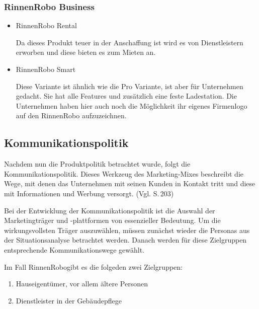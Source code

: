         \subsubsection{RinnenRobo Business}
            \begin{itemize}
                \item RinnenRobo Rental
                
                    Da dieses Produkt teuer in der Anschaffung ist wird es von Dienstleistern erworben und diese bieten
                    es zum Mieten an.  

                \item RinnenRobo Smart
                
                    Diese Variante ist ähnlich wie die Pro Variante, ist aber für Unternehmen gedacht. Sie hat alle
                    Features und zusätzlich eine feste Ladestation. Die Unternehmen haben hier auch noch die Möglichkeit
                    ihr eigenes Firmenlogo auf den RinnenRobo aufzuzeichnen. 
            \end{itemize}

            \subsection{Kommunikationspolitik} \label{Kompo}
            Nachdem nun die Produktpolitik betrachtet wurde, folgt die Kommunikationspolitik. Dieses Werkzeug des 
            Marketing-Mixes beschreibt die Wege, mit denen das Unternehmen mit seinen Kunden in Kontakt tritt und diese mit
            Informationen und Werbung versorgt. (Vgl. \cite{Kuss2016} S.\,203)
        
            \noindent
            Bei der Entwicklung der Kommunikationspolitik ist die Auswahl der Marketingträger und -plattformen von essenzieller
            Bedeutung. Um die wirkungsvollsten Träger auszuwählen, müssen zunächst wieder die Personas aus der Situationsanalyse
            betrachtet werden. Danach werden für diese Zielgruppen entsprechende Kommunikationswege gewählt.
        
            \noindent Im Fall \as RinnenRobo\adl gibt es die folgeden zwei Zielgruppen:
        
            \begin{enumerate}
                \item Hauseigentümer, vor allem ältere Personen
                \item Dienstleister in der Gebäudepflege
            \end{enumerate}
        
